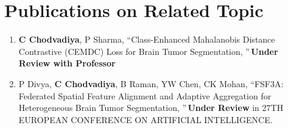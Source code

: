 

\section*{\textcolor{internationalkleinblue}{\textbf{Publications on Related Topic}}}
\begin{enumerate}
	\item \textbf{C Chodvadiya}, P Sharma, \textquotedblleft Class-Enhanced Mahalanobis Distance Contrastive (CEMDC) Loss for Brain Tumor Segmentation, \textquotedblright \,\textcolor{internationalkleinblue}{\textbf{Under Review with Professor}}

    \item P Divya, \textbf{C Chodvadiya}, B Raman, YW Chen, CK Mohan, \textquotedblleft FSF3A: Federated Spatial Feature Alignment and Adaptive Aggregation for Heterogeneous Brain Tumor Segmentation, \textquotedblright \,\textcolor{internationalkleinblue}{\textbf{Under Review}} in 27TH EUROPEAN CONFERENCE ON ARTIFICIAL INTELLIGENCE.
	
\end{enumerate}
\newpage


